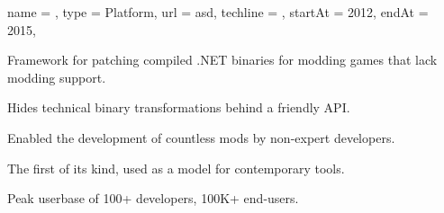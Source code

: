 \begin{projectx}{%
    name = {\patchwork},
    type = {Platform},
    url = asd,
    techline = {\noexpand{}},
    startAt = 2012,
    endAt = 2015,
  }%
\item Framework for patching compiled .NET binaries for modding
  games that lack modding support.
\item Hides technical binary transformations behind a friendly API.
\item Enabled the development of countless mods by non-expert developers.
\item The first of its kind, used as a model for contemporary tools.
\item Peak userbase of 100+ developers, 100K+ end-users.
\end{projectx}
